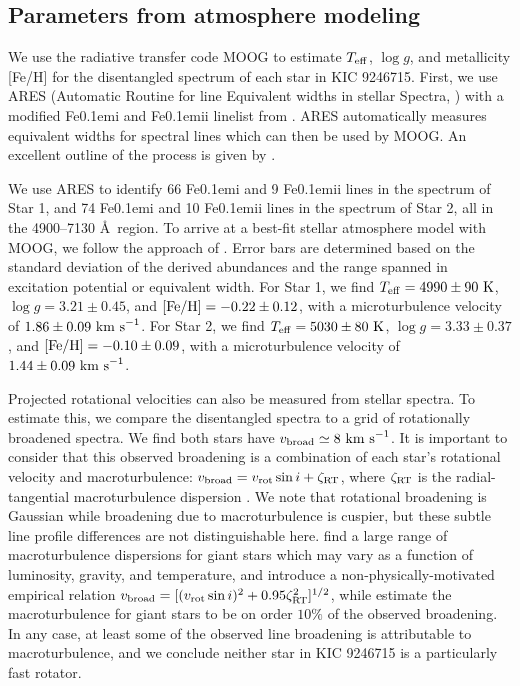 \subsection{Parameters from atmosphere modeling}\label{parameters}
We use the radiative transfer code MOOG \citep{sne73} to estimate $T_{\rm{eff}}$, $\log g$, and metallicity [Fe/H] for the disentangled spectrum of each star in KIC 9246715. First, we use ARES (Automatic Routine for line Equivalent widths in stellar Spectra, \citealt{Sousa_2007}) with a modified {\rm Fe}\kern 0.1em{\sc i} and {\rm Fe}\kern 0.1em{\sc ii} linelist from \citet{tsa13}. ARES automatically measures equivalent widths for spectral lines which can then be used by MOOG. An excellent outline of the process is given by \citet{Sousa_2014}.

We use ARES to identify 66 {\rm Fe}\kern 0.1em{\sc i} and 9 {\rm Fe}\kern 0.1em{\sc ii} lines in the spectrum of Star 1, and 74 {\rm Fe}\kern 0.1em{\sc i} and 10 {\rm Fe}\kern 0.1em{\sc ii} lines in the spectrum of Star 2, all in the 4900--7130 \AA \ region. To arrive at a best-fit stellar atmosphere model with MOOG, we follow the approach of \citet{mag13}. Error bars are determined based on the standard deviation of the derived abundances and the range spanned in excitation potential or equivalent width. For Star 1, we find $T_{\rm{eff}} = 4990 \pm 90 \ \rm{K}$, $\log g = 3.21 \pm 0.45$, and $\rm{[Fe/H]} = -0.22 \pm 0.12$, with a microturbulence velocity of $1.86 \pm 0.09 \ \rm{km \ s}^{-1}$. For Star 2, we find $T_{\rm{eff}} = 5030 \pm 80 \ \rm{K}$, $\log g = 3.33 \pm 0.37$, and $\rm{[Fe/H]} = -0.10 \pm 0.09$, with a microturbulence velocity of $1.44 \pm 0.09 \ \rm{km \ s}^{-1}$.

Projected rotational velocities can also be measured from stellar spectra. To estimate this, we compare the disentangled spectra to a grid of rotationally broadened spectra. We find both stars have $v_{\rm{broad}} \simeq 8 \ \rm{km \ s}^{-1}$. It is important to consider that this observed broadening is a combination of each star's rotational velocity and macroturbulence: $v_{\rm{broad}} = v_{\rm{rot}} \sin i + \zeta_{\rm{RT}}$, where $\zeta_{\rm{RT}}$ is the radial-tangential macroturbulence dispersion \citep{gra78}. We note that rotational broadening is Gaussian while broadening due to macroturbulence is cuspier, but these subtle line profile differences are not distinguishable here. \citet{car08} find a large range of macroturbulence dispersions for giant stars which may vary as a function of luminosity, gravity, and temperature, and introduce a non-physically-motivated empirical relation $v_{\rm{broad}} = [(v_{\rm{rot}} \sin i)^2 + 0.95\zeta_{\rm{RT}}^2]^{1/2}$, while \citet{tay15} estimate the macroturbulence for giant stars to be on order $10 \%$ of the observed broadening. In any case, at least some of the observed line broadening is attributable to macroturbulence, and we conclude neither star in KIC 9246715 is a particularly fast rotator.

  